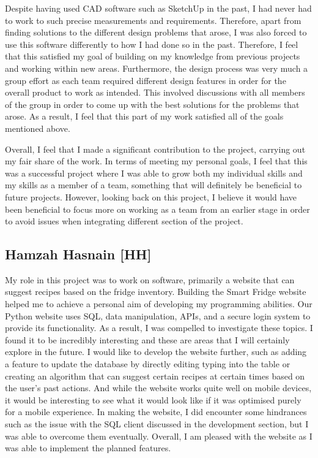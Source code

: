 Despite having used CAD software such as SketchUp in the past, I had never had to work to such precise measurements and requirements.
Therefore, apart from finding solutions to the different design problems that arose, I was also forced to use this software differently to how I had done so in the past.
Therefore, I feel that this satisfied my goal of building on my knowledge from previous projects and working within new areas.
Furthermore, the design process was very much a group effort as each team required different design features in order for the overall product to work as intended.
This involved discussions with all members of the group in order to come up with the best solutions for the problems that arose.
As a result, I feel that this part of my work satisfied all of the goals mentioned above.

Overall, I feel that I made a significant contribution to the project, carrying out my fair share of the work.
In terms of meeting my personal goals, I feel that this was a successful project where I was able to grow both my individual skills and my skills as a member of a team, something that will definitely be beneficial to future projects.
However, looking back on this project, I believe it would have been beneficial to focus more on working as a team from an earlier stage in order to avoid issues when integrating different section of the project.


\subsection{Hamzah Hasnain [HH]}
My role in this project was to work on software, primarily a website that can suggest recipes based on the fridge inventory.
Building the Smart Fridge website helped me to achieve a personal aim of developing my programming abilities.
Our Python website uses SQL, data manipulation, APIs, and a secure login system to provide its functionality.
 As a result, I was compelled to investigate these topics.
I found it to be incredibly interesting and these are areas that I will certainly explore in the future.
I would like to develop the website further, such as adding a feature to update the database by directly editing typing into the table or creating an algorithm that can suggest certain recipes at certain times based on the user’s past actions.
And while the website works quite well on mobile devices, it would be interesting to see what it would look like if it was optimised purely for a mobile experience.
In making the website, I did encounter some hindrances such as the issue with the SQL client discussed in the development section, but I was able to overcome them eventually.
Overall, I am pleased with the website as I was able to implement the planned features.

